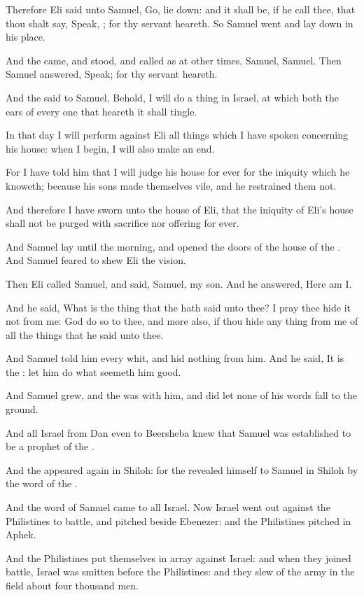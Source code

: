 \Verse Therefore Eli said unto Samuel, Go, lie down: and it shall be, if he call thee, that thou shalt say, Speak, \LORD; for thy servant heareth. So Samuel went and lay down in his place.

\Verse And the \LORD came, and stood, and called as at other times, Samuel, Samuel. Then Samuel answered, Speak; for thy servant heareth.

\Verse And the \LORD said to Samuel, Behold, I will do a thing in Israel, at which both the ears of every one that heareth it shall tingle.

\Verse In that day I will perform against Eli all things which I have spoken concerning his house: when I begin, I will also make an end.

\Verse For I have told him that I will judge his house for ever for the iniquity which he knoweth; because his sons made themselves vile, and he restrained them not.

\Verse And therefore I have sworn unto the house of Eli, that the iniquity of Eli's house shall not be purged with sacrifice nor offering for ever.

\Verse And Samuel lay until the morning, and opened the doors of the house of the \LORD. And Samuel feared to shew Eli the vision.

\Verse Then Eli called Samuel, and said, Samuel, my son. And he answered, Here am I.

\Verse And he said, What is the thing that the \LORD hath said unto thee?  I pray thee hide it not from me: God do so to thee, and more also, if thou hide any thing from me of all the things that he said unto thee.

\Verse And Samuel told him every whit, and hid nothing from him. And he said, It is the \LORD: let him do what seemeth him good.

\Verse And Samuel grew, and the \LORD was with him, and did let none of his words fall to the ground.

\Verse And all Israel from Dan even to Beersheba knew that Samuel was established to be a prophet of the \LORD.

\Verse And the \LORD appeared again in Shiloh: for the \LORD revealed himself to Samuel in Shiloh by the word of the \LORD.


\Chapter
\Verse And the word of Samuel came to all Israel. Now Israel went out against the Philistines to battle, and pitched beside Ebenezer: and the Philistines pitched in Aphek.

\Verse And the Philistines put themselves in array against Israel: and when they joined battle, Israel was smitten before the Philistines: and they slew of the army in the field about four thousand men.

